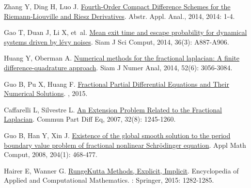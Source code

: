\begin{thebibliography}{77}
    Zhang Y, Ding H, Luo J.
    \newblock \href{http://www.hindawi.com/journals/aaa/2014/540692/}{Fourth-{{Order Compact Difference Schemes}} for the {{Riemann-Liouville}} and {{Riesz Derivatives}}}\allowbreak[J].
    \newblock Abstr. Appl. Anal., 2014, 2014: 1-4.
    
    Gao T, Duan J, Li X, et~al.
    \newblock \href{https://doi.org/10.1137/120897262}{Mean exit time and escape probability for dynamical systems driven by l{\'e}vy noises}\allowbreak[J].
    \newblock Siam J Sci Comput, 2014, 36\allowbreak (3): A887-A906.
    
    Huang Y, Oberman A.
    \newblock \href{https://doi.org/10.1137/140954040}{Numerical methods for the fractional laplacian: {{A}} finite difference-quadrature approach}\allowbreak[J].
    \newblock Siam J Numer Anal, 2014, 52\allowbreak (6): 3056-3084.
    
    Guo B, Pu X, Huang F.
    \newblock \href{https://www.worldscientific.com/worldscibooks/10.1142/9543}{{Fractional Partial Differential Equations and Their Numerical Solutions}}\allowbreak[M].
    , 2015.
    
    Caffarelli L, Silvestre L.
    \newblock \href{http://www.tandfonline.com/doi/abs/10.1080/03605300600987306}{An {{Extension Problem Related}} to the {{Fractional Laplacian}}}\allowbreak[J].
    \newblock Commun Part Diff Eq, 2007, 32\allowbreak (8): 1245-1260.
    
    Guo B, Han Y, Xin J.
    \newblock \href{https://www.sciencedirect.com/science/article/pii/S0096300308005341}{Existence of the global smooth solution to the period boundary value problem of fractional nonlinear {{Schr{\"o}dinger}} equation}\allowbreak[J].
    \newblock Appl Math Comput, 2008, 204\allowbreak (1): 468-477.
    
    Hairer E, Wanner G.
    \newblock \href{https://doi.org/10.1007/978-3-540-70529-1_144}{Runge{\textendash}{{Kutta Methods}}, {{Explicit}}, {{Implicit}}}\allowbreak[M].
    \newblock Encyclopedia of {{Applied}} and {{Computational Mathematics}}.
    : {Springer}, 2015: 1282-1285.
    

\end{thebibliography}
